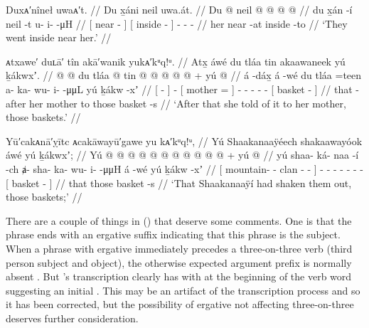 \ex\label{ex:92-194-went-inside-near}%
%
\begingl
	\glpreamble	Duxᴀ′nîneł uwaᴀ′t. //
	\glpreamble	Du x̱áni neil uwa.át. //
	\gla	{} Du  @ {} {} {} neil @ {} {}
		 @ {} @ {} @ {} //
	\glb	{} du x̱án -í {} {} neil -t {}
		u- i-  -μH //
	\glc	{}[  near - {}] {}[ inside - {}]
		- -  - //
	\gld	{} her near -at {} {} inside -to {}
		 {} {} {} //
	\glft	‘They went inside near her.’
		//
\endgl
\xe

\ex\label{ex:92-195-told-mother-baskets}%
%
\begingl
	\glpreamble	ᴀtxawe′ duʟā′ tîn akā′wanik yukᴀ′kᵘq!ᵘ. //
	\glpreamble	Atx̱ áwé du tláa tin akaawaneek yú ḵákwxʼ. //
	\gla	{}  @ {} {}  @ {}
		{} du tláa @ \•tin {}
		 @ {} @ {} @ {} @ {} @ {} +
		{} yú  @ {} {} //
	\glb	{} á -dáx̱ {} á -wé
		{} du tláa =teen {}
		a- ka- wu- i-  -μμL
		{} yú ḵákw -xʼ {} //
	\glc	{}[  - {}]  -
		{}[  mother = {}]
		- - - -  -
		{}[  basket - {}] //
	\gld	{} that -after {}  {}
		{} her mother \•to {}
		 {} {} {} {} {}
		{} those basket -s {} //
	\glft	‘After that she told of it to her mother, those baskets.’
		//
\endgl
\xe

\ex\label{ex:92-196-shook-out-baskets}%
%
\begingl
	\glpreamble	Yū′cakᴀnā′ỵītc ᴀcakāwayū′gawe yu kᴀ′kᵘq!ᵘ, //
	\glpreamble	Yú Shaakanaaÿéech shakaawayóok áwé yú ḵákwxʼ; //
	\gla	{} Yú  @ {} @ {} @ {} @ {} {}
		 @ {} @ {} @ {} @ {} @ {} @ {}
		 @ {} +
		{} yú  @ {} {} //
	\glb	{} yú shaa- ká- naa -í -ch {}
		ⱥ- sha- ka- wu- i-  -μμH
		á -wé
		{} yú ḵákw -xʼ {} //
	\glc	{}[  mountain- - clan - - {}]
		- - - - -  -
		 -
		{}[  basket - {}] //
	\gld	{} that  {} {} {} {} {}
		 {} {} {} {} {} {}
		 {}
		{} those basket -s {} //
	\glft	‘That Shaakanaaÿí had shaken them out, those baskets;’
		//
\endgl
\xe

There are a couple of things in (\lastx) that deserve some comments.
One is that the phrase  ends with an ergative suffix  indicating that this phrase is the subject.
When a phrase with ergative  immediately precedes a three-on-three verb (third person subject and object), the otherwise expected  argument prefix is normally absent \parencites[25 fn.\ 12]{leer:1991}{crippen:2016}[724]{crippen:2019}.
But \citeauthor{swanton:1909}’s transcription clearly has  with  at the beginning of the verb word suggesting an initial .
This may be an artifact of the transcription process and so it has been corrected, but the possibility of ergative  not affecting three-on-three  deserves further consideration.


